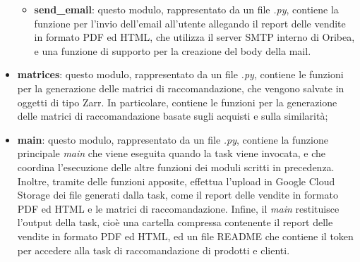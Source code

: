 \begin{itemize}
\begin{itemize}
        \item \textbf{send\_email}: questo modulo, rappresentato da un file \emph{.py}, contiene la funzione per l'invio dell'email all'utente allegando il report delle vendite in formato PDF ed HTML, che utilizza il server SMTP interno di Oribea, e una funzione di supporto per la creazione del body della mail.
    \end{itemize}
    \item \textbf{matrices}: questo modulo, rappresentato da un file \emph{.py}, contiene le funzioni per la generazione delle matrici di raccomandazione, che vengono salvate in oggetti di tipo Zarr. In particolare, contiene le funzioni per la generazione delle matrici di raccomandazione basate sugli acquisti e sulla similarità;
    \item \textbf{main}: questo modulo, rappresentato da un file \emph{.py}, contiene la funzione principale \emph{main} che viene eseguita quando la task viene invocata, e che coordina l'esecuzione delle altre funzioni dei moduli scritti in precedenza. Inoltre, tramite delle funzioni apposite, effettua l'upload in Google Cloud Storage dei file generati dalla task, come il report delle vendite in formato PDF ed HTML e le matrici di raccomandazione. Infine, il \emph{main} restituisce l'output della task, cioè una cartella compressa contenente il report delle vendite in formato PDF ed HTML, ed un file README che contiene il token per accedere alla task di raccomandazione di prodotti e clienti.
\end{itemize}

